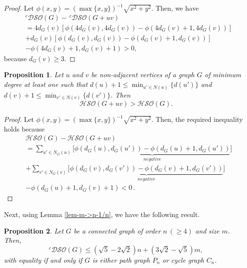 \documentclass[12pt,a4paper]{article}
\newtheorem{proposition}{Proposition}[section]
\begin{document}
\begin{proof}
Let
$\phi(x,y)= (\max\{x,y\})^{-1}\sqrt{x^2+y^2}$. Then, we have
\begin{align*}
&^c\mathcal{DSO}(G)-\, ^c\mathcal{DSO}(G+uv)\\[2mm]
&= 4d_G(v)[\phi(4d_G(v),4d_G(v))-\phi(4d_G(v)+1,4d_G(v))]\\[2mm]
&+ d_G(v)[\phi(d_G(v),d_G(v))-\phi(d_G(v)+1,d_G(v))] \\[2mm]
& - \phi(4d_G(v)+1,d_G(v)+1)>0,
\end{align*}
because $d_G(v)\ge3$.
\end{proof}



\begin{proposition}\label{prop-G+uv>G-CDSO}
Let $u$ and $v$ be non-adjacent vertices of a graph $G$ of minimum degree at least one such that $d(u)+1\le \min_{u'\in N(u)}\{d(u')\}$ and $d(v)+1\le \min_{v'\in N(v)}\{d(v')\}$. Then
$$
\mathcal{HSO}(G+uv)
> \mathcal{HSO}(G).
$$
\end{proposition}





\begin{proof}
Let
$\phi(x,y)= (\max\{x,y\})^{-1}\sqrt{x^2+y^2}$. Then, the required inequality holds because
\begin{align*}
&\mathcal{HSO}(G)-\mathcal{HSO}(G+uv)\\[2mm]
&= \sum_{u'\in N_G(u)}\bigg[\underbrace{\phi(d_G(u),d_G(u'))-\phi(d_G(u)+1,d_G(u'))}_{negative}\bigg]\\[2mm]
&+ \sum_{v'\in N_G(v)}\bigg[\underbrace{\phi(d_G(v),d_G(v'))-\phi(d_G(v)+1,d_G(v'))}_{negative}\bigg] \\
& - \phi(d_G(u)+1,d_G(v)+1) <0\,.
\end{align*}
\end{proof}



Next, using Lemma \ref{lem-m->n-1/n}, we have the following result.

\begin{proposition}\label{prop-path-cycle-maximal}
Let $G$ be a connected graph of order $n\ (\ge4)$ and size $m$. Then,
\begin{equation*}
^c\mathcal{DSO}(G) \le \left(\sqrt{5}-2\sqrt{2}\right)n + \left(3\sqrt{2}-\sqrt{5}\right)m,
\end{equation*}
with equality if and only if $G$ is either path graph $P_n$ or cycle graph $C_n$.
\end{proposition}
\end{document}
